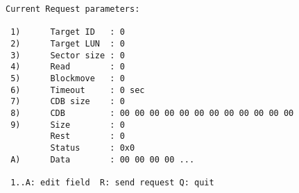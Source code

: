 \begin{screendump}
  \begin{verbatim}
Current Request parameters:

 1)      Target ID   : 0
 2)      Target LUN  : 0
 3)      Sector size : 0
 4)      Read        : 0
 5)      Blockmove   : 0
 6)      Timeout     : 0 sec
 7)      CDB size    : 0
 8)      CDB         : 00 00 00 00 00 00 00 00 00 00 00 00
 9)      Size        : 0
         Rest        : 0
         Status      : 0x0
 A)      Data        : 00 00 00 00 ...

 1..A: edit field  R: send request Q: quit
  \end{verbatim}
\end{screendump}
